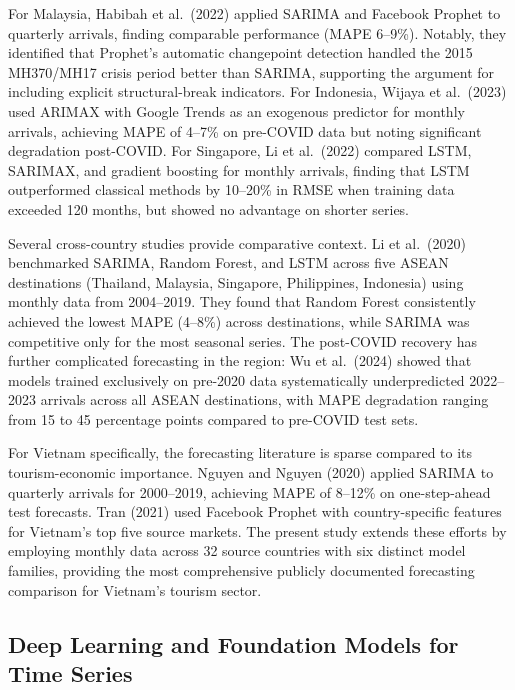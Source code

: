 \documentclass[
]{article}
\begin{document}
For Malaysia, Habibah et al.~(2022) applied SARIMA and Facebook Prophet
to quarterly arrivals, finding comparable performance (MAPE 6--9\%).
Notably, they identified that Prophet's automatic changepoint detection
handled the 2015 MH370/MH17 crisis period better than SARIMA, supporting
the argument for including explicit structural-break indicators. For
Indonesia, Wijaya et al.~(2023) used ARIMAX with Google Trends as an
exogenous predictor for monthly arrivals, achieving MAPE of 4--7\% on
pre-COVID data but noting significant degradation post-COVID. For
Singapore, Li et al.~(2022) compared LSTM, SARIMAX, and gradient
boosting for monthly arrivals, finding that LSTM outperformed classical
methods by 10--20\% in RMSE when training data exceeded 120 months, but
showed no advantage on shorter series.

Several cross-country studies provide comparative context. Li et
al.~(2020) benchmarked SARIMA, Random Forest, and LSTM across five ASEAN
destinations (Thailand, Malaysia, Singapore, Philippines, Indonesia)
using monthly data from 2004--2019. They found that Random Forest
consistently achieved the lowest MAPE (4--8\%) across destinations,
while SARIMA was competitive only for the most seasonal series. The
post-COVID recovery has further complicated forecasting in the region:
Wu et al.~(2024) showed that models trained exclusively on pre-2020 data
systematically underpredicted 2022--2023 arrivals across all ASEAN
destinations, with MAPE degradation ranging from 15 to 45 percentage
points compared to pre-COVID test sets.

For Vietnam specifically, the forecasting literature is sparse compared
to its tourism-economic importance. Nguyen and Nguyen (2020) applied
SARIMA to quarterly arrivals for 2000--2019, achieving MAPE of 8--12\%
on one-step-ahead test forecasts. Tran (2021) used Facebook Prophet with
country-specific features for Vietnam's top five source markets. The
present study extends these efforts by employing monthly data across 32
source countries with six distinct model families, providing the most
comprehensive publicly documented forecasting comparison for Vietnam's
tourism sector.

\subsection{Deep Learning and Foundation Models for Time
Series}\label{deep-learning-and-foundation-models-for-time-series}
\end{document}

